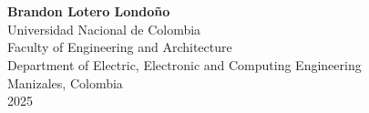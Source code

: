 
\begin{center}

  \begin{figure} \centering
    \\[1.8cm]
  \end{figure}

  \thispagestyle{empty}

  \begin{spacing}{1.9}
    \textbf{\huge \thesistitle    }\\[2cm]
  \end{spacing}

  \Large
  \textbf{Brandon Lotero Londoño}\\[3cm]

  \small
  Universidad Nacional de Colombia\\
  Faculty of Engineering and Architecture\\
  Department of Electric, Electronic and Computing Engineering\\
  Manizales, Colombia\\
  2025\\

\end{center}

\newpage{\pagestyle{empty}\cleardoublepage}
\newpage

